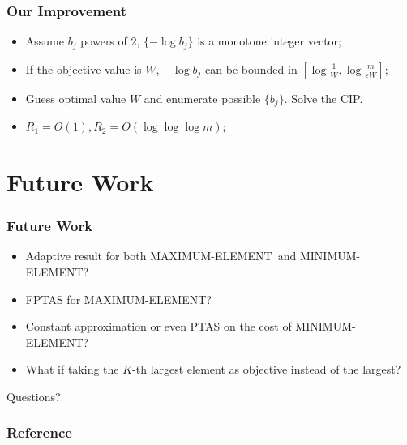 \documentclass{beamer}
\newcommand{\MM}{{\textsf{MAXIMUM-ELEMENT}}}
\newcommand{\mm}{{\textsf{MINIMUM-ELEMENT}}}
\begin{document}
\begin{frame}
    \frametitle{Our Improvement}
    \begin{itemize}
        \item Assume $b_j$ powers of $2$, $\{-\log b_j\}$ is a monotone integer vector;
        \item If the objective value is $W$, $-\log b_j$ can be bounded in $[\log\frac{1}{W}, \log\frac{m}{\varepsilon W}]$;
        \item Guess optimal value $W$ and enumerate possible $\{b_j\}$. Solve the CIP.
        \item $R_1 = O(1), R_2 = O(\log\log\log m)$;
    \end{itemize}

\end{frame}

\section{Future Work}
\begin{frame}
    \frametitle{Future Work}
    \begin{itemize}
        \item Adaptive result for both \MM\ and \mm?
        \item FPTAS for \MM?
        \item Constant approximation or even PTAS on the cost of \mm?
        \item What if taking the $K$-th largest element as objective instead of the largest?
    \end{itemize}
\end{frame}

\begin{frame}
Questions?
\end{frame}

\begin{frame}\frametitle{Reference}


\end{frame}
\end{document}
